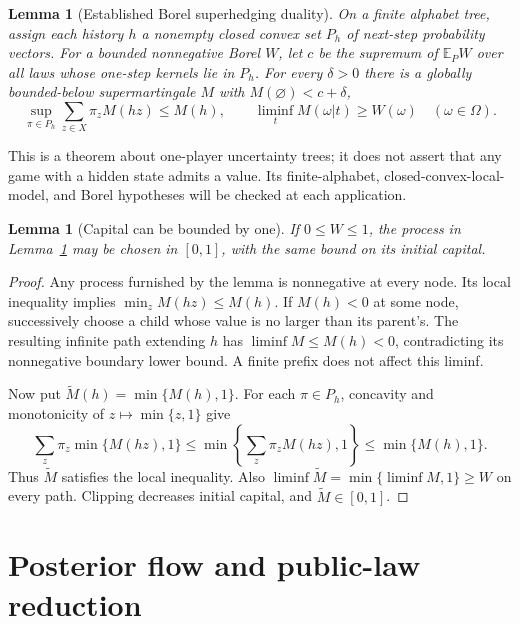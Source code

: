 \documentclass[11pt,a4paper]{article}
\newtheorem{lemma}[theorem]{Lemma}
\theoremstyle{definition}
\newcommand{\E}{\mathbb E}
\begin{document}
\begin{lemma}[Established Borel superhedging duality]\label{duality}
On a finite alphabet tree, assign each history $h$ a nonempty closed
convex set $P_h$ of next-step probability vectors. For a bounded
nonnegative Borel $W$, let $c$ be the supremum of $\E_P W$ over all laws
whose one-step kernels lie in $P_h$. For every $\delta>0$ there is a
globally bounded-below supermartingale $M$ with $M(\varnothing)<c+\delta$,
\[
 \sup_{\pi\in P_h}\sum_{z\in X}\pi_z M(hz)\leq M(h),
 \qquad
 \liminf_t M(\omega|t)\geq W(\omega)\quad(\omega\in\Omega).
\]
\end{lemma}

This is a theorem about one-player uncertainty trees; it does not assert
that any game with a hidden state admits a value. Its finite-alphabet,
closed-convex-local-model, and Borel hypotheses will be checked at each
application.

\begin{lemma}[Capital can be bounded by one]\label{clip}
If $0\leq W\leq1$, the process in Lemma~\ref{duality} may be chosen in
$[0,1]$, with the same bound on its initial capital.
\end{lemma}
\begin{proof}
Any process furnished by the lemma is nonnegative at every node. Its
local inequality implies $\min_z M(hz)\leq M(h)$. If $M(h)<0$ at some
node, successively choose a child whose value is no larger than its
parent's. The resulting infinite path extending $h$ has
$\liminf M\leq M(h)<0$, contradicting its nonnegative boundary lower
bound. A finite prefix does not affect this liminf.

Now put $\widetilde M(h)=\min\{M(h),1\}$. For each $\pi\in P_h$,
concavity and monotonicity of $z\mapsto\min\{z,1\}$ give
\[
 \sum_z\pi_z\min\{M(hz),1\}
 \leq\min\left\{\sum_z\pi_zM(hz),1\right\}
 \leq\min\{M(h),1\}.
\]
Thus $\widetilde M$ satisfies the local inequality. Also
$\liminf\widetilde M=\min\{\liminf M,1\}\geq W$ on every path.
Clipping decreases initial capital, and $\widetilde M\in[0,1]$.
\end{proof}

\section{Posterior flow and public-law reduction}
\end{document}
